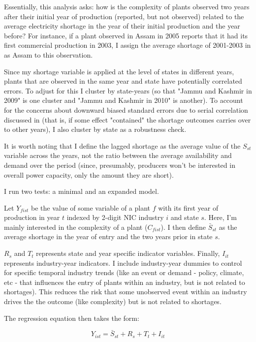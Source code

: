 \documentclass[11pt]{article}
\begin{document}
Essentially, this analysis asks: how is the complexity of plants observed two years after their initial year of production (reported, but not observed) related to the average electricity shortage in the year of their initial production and the year before? For instance, if a plant observed in Assam in 2005 reports that it had its first commercial production in 2003, I assign the average shortage of 2001-2003 in as Assam to this observation.

Since my shortage variable is applied at the level of states in different years, plants that are observed in the same year and state have potentially correlated errors. To adjust for this I cluster by state-years (so that "Jammu and Kashmir in 2009" is one cluster and "Jammu and Kashmir in 2010" is another). To account for the concerns about downward biased standard errors due to serial correlation discussed in \cite{bertrand_how_2004} (that is, if some effect "contained" the shortage outcomes carries over to other years), I also cluster by state as a robustness check.

It is worth noting that I define the lagged shortage as the average value of the $S_{st}$ variable across the years, not the ratio between the average availability and demand over the period (since, presumably, producers won't be interested in overall power capacity, only the amount they are short).

I run two tests: a minimal and an expanded model. 

Let $Y_{fist}$ be the value of some variable of a plant $f$ with its first year of production in year $t$ indexed by 2-digit NIC industry $i$ and state $s$. Here, I'm mainly interested in the complexity of a plant ($C_{fist}$). I then define $\bar{S}_{st}$ as the average shortage in the year of entry and the two years prior in state $s$. 

$R_{s}$ and $T_{t}$ represents state and year specific indicator variables. Finally, $I_{it}$ represents industry-year indicators. I include industry-year dummies to control for specific temporal industry trends (like an event or demand - policy, climate, etc - that influences the entry of plants within an industry, but is not related to shortages). This reduces the risk that some unobserved event within an industry drives the the outcome (like complexity) but is not related to shortages.

The regression equation then takes the form:

\[
	Y_{ist} = \bar{S}_{st} + R_{s} + T_{t} + I_{it} 
\]
\end{document}
